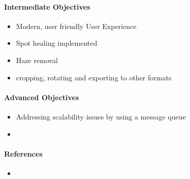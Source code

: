 \documentclass{article}
\begin{document}
    \paragraph{Intermediate Objectives}
        \begin{itemize}
          \item Modern, user friendly User Experience
          \item Spot healing implemented
          \item Haze removal
          \item cropping, rotating and exporting to other formats
        \end{itemize}
    \paragraph{Advanced Objectives}
        \begin{itemize}
          \item Addressing scalability issues by using a message queue
          \item
        \end{itemize}
    \paragraph{References}
        \begin{itemize}
          \item 
        \end{itemize}
\end{document}
